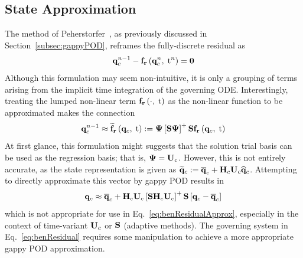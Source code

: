 \subsection{State Approximation}\label{subsec:stateApproxDEIM}
%
The method of Peherstorfer~\cite{Peherstorfer2020Adaptive}, as previously discussed in Section~\ref{subsec:gappyPOD}, reframes the fully-discrete residual as
%
\begin{equation}\label{eq:benResidualTwo}
	\mathbf{q}_{c}^{n-1} - \mathbf{f}_{\mathbf{r}}\left(\mathbf{q}_{c}^{n},\; \text{t}^{n}\right) = \mathbf{0}
\end{equation}
%
Although this formulation may seem non-intuitive, it is only a grouping of terms arising from the implicit time integration of the governing ODE. Interestingly, treating the lumped non-linear term $\mathbf{f}_{\mathbf{r}}\left(\cdot, \; \text{t}\right)$ as the non-linear function to be approximated makes the connection
%
\begin{equation}\label{eq:benResidualApprox}
	\consVec^{\timeIdx-1} \approx \rhsResApproxFunc{\consVec, \; \timeVar} \defEq \deimBasis \left[\sampMat \deimBasis \right]^+ \sampMat \rhsResFunc{\consVec, \; \timeVar}
\end{equation}
%
At first glance, this formulation might suggests that the solution trial basis can be used as the regression basis; that is, $\deimBasis = \consTrial$. However, this is not entirely accurate, as the state representation is given as $\consVecRom \defEq \consVecCent + \consScale \consTrial \consVecCoef$. Attempting to directly approximate this vector by gappy POD results in
%
\begin{equation}\label{eq:stateGPODWrong}
	\consVec \approx \consVecCent + \consScale \consTrial \left[\sampMat \consScale \consTrial\right]^+ \sampMat \left[\consVec - \consVecCent\right]
\end{equation}
%
which is not appropriate for use in Eq.~\ref{eq:benResidualApprox}, especially in the context of time-variant $\consTrial$ or $\mathbf{S}$ (adaptive methods). The governing system in Eq.~\ref{eq:benResidual} requires some manipulation to achieve a more appropriate gappy POD approximation.

